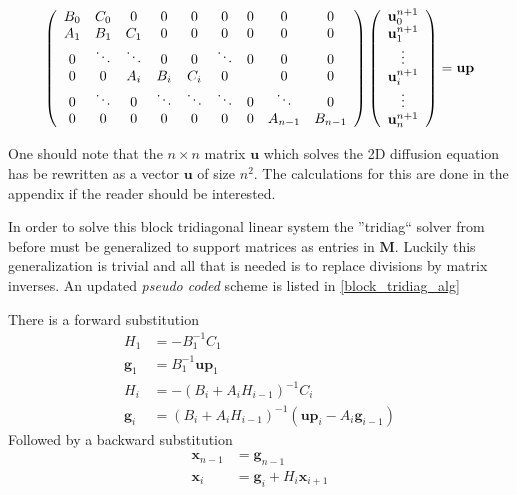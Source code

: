 \begin{align}\label{theory:block_tridiagonal_matrix}
   \left(\begin{array}{c c c c c c c c c}
        B_0 & C_0 &0 &0 &0 &0 &0 &0 &0\\
        A_1 & B_1 & C_1 &0 &0 &0 &0 &0 &0\\
        0&\ddots & \ddots & 0 & 0 & \ddots &0&0&0\\
        0 & 0&A_i & B_i & C_i& 0 &  &0&0\\
        0& \ddots&0&\ddots & \ddots & \ddots & 0 & \ddots &0\\
         0&0 &0 &0&0 &0&0&A_{n-1} & B_{n-1}
       \end{array}\right) \left(\begin{array}{c}
             \mathbf{u}^{n+1}_{0}\\
             \mathbf{u}^{n+1}_{1}\\
             \vdots\\
             \mathbf{u}^{n+1}_{i}\\
             \vdots\\
             \mathbf{u}^{n+1}_{n}
             \end{array}\right) = \mathbf{up}
\end{align}

One should note that the $n\times n$ matrix $\mathbf u$ which solves the 2D diffusion equation has be rewritten as a vector $\mathbf{u}$ of size $n^2$. 
The calculations for this are done in the appendix if the reader should be interested. 

In order to solve this block tridiagonal linear system the ''tridiag`` solver from before must be generalized to support matrices as entries in $\mathbf M$. 
Luckily this generalization is trivial and all that is needed is to replace divisions by matrix inverses. 
An updated \emph{pseudo coded} scheme is listed in \eqref{block_tridiag_alg}

There is a forward substitution
\begin{align}\label{block_tridiag_alg}
 H_1 &= -B_1^{-1}C_1\nonumber \\
 \mathbf{g}_1 &= B_1^{-1}\mathbf{up}_1 \nonumber\\
 H_i &= -\left(B_i+A_iH_{i-1}\right)^{-1}C_i \nonumber \\
 \mathbf{g}_i &= \left(B_i+A_iH_{i-1}\right)^{-1}\left(\mathbf{up}_i-A_i\mathbf{g}_{i-1}\right)
 \end{align}
 Followed by a backward substitution
 \begin{align*}
  \mathbf{x}_{n-1} &= \mathbf{g}_{n-1}\nonumber\\
  \mathbf{x}_i &= \mathbf{g}_i + H_i\mathbf{x}_{i+1} \nonumber
 \end{align*}
 
